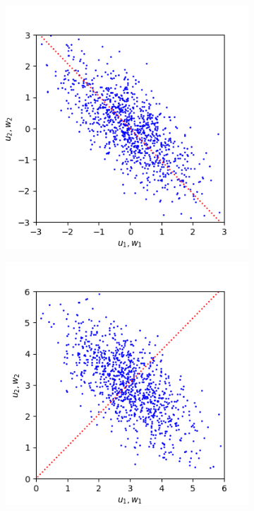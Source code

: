\documentclass{article}
\begin{document}
\begin{figure}[h]
	\centering
	\begin{subfigure}[t]{0.25\linewidth}
		\centering
		\includegraphics[width = 1.0\linewidth, trim={0 0 25 30}, clip=true]{figures/2d_sim1.png}
		\label{fig:sim1mul}	
	\end{subfigure}%
	\hspace{0.07\linewidth}
	\begin{subfigure}[t]{0.25\linewidth}
		\centering
		\includegraphics[width = 1.0\linewidth, trim={0 0 25 30}, clip=true]{figures/2d_sim2.png}

\end{subfigure}
\end{figure}
\end{document}
